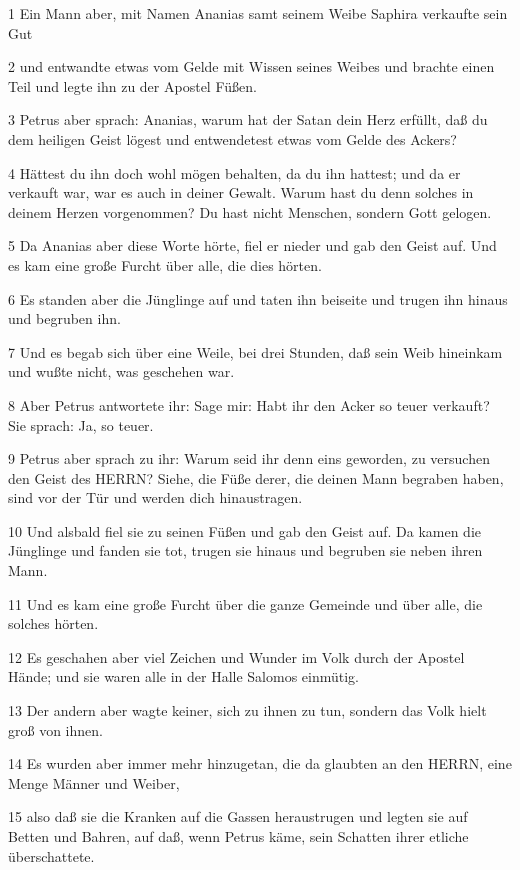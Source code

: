 \par 1 Ein Mann aber, mit Namen Ananias samt seinem Weibe Saphira verkaufte sein Gut
\par 2 und entwandte etwas vom Gelde mit Wissen seines Weibes und brachte einen Teil und legte ihn zu der Apostel Füßen.
\par 3 Petrus aber sprach: Ananias, warum hat der Satan dein Herz erfüllt, daß du dem heiligen Geist lögest und entwendetest etwas vom Gelde des Ackers?
\par 4 Hättest du ihn doch wohl mögen behalten, da du ihn hattest; und da er verkauft war, war es auch in deiner Gewalt. Warum hast du denn solches in deinem Herzen vorgenommen? Du hast nicht Menschen, sondern Gott gelogen.
\par 5 Da Ananias aber diese Worte hörte, fiel er nieder und gab den Geist auf. Und es kam eine große Furcht über alle, die dies hörten.
\par 6 Es standen aber die Jünglinge auf und taten ihn beiseite und trugen ihn hinaus und begruben ihn.
\par 7 Und es begab sich über eine Weile, bei drei Stunden, daß sein Weib hineinkam und wußte nicht, was geschehen war.
\par 8 Aber Petrus antwortete ihr: Sage mir: Habt ihr den Acker so teuer verkauft? Sie sprach: Ja, so teuer.
\par 9 Petrus aber sprach zu ihr: Warum seid ihr denn eins geworden, zu versuchen den Geist des HERRN? Siehe, die Füße derer, die deinen Mann begraben haben, sind vor der Tür und werden dich hinaustragen.
\par 10 Und alsbald fiel sie zu seinen Füßen und gab den Geist auf. Da kamen die Jünglinge und fanden sie tot, trugen sie hinaus und begruben sie neben ihren Mann.
\par 11 Und es kam eine große Furcht über die ganze Gemeinde und über alle, die solches hörten.
\par 12 Es geschahen aber viel Zeichen und Wunder im Volk durch der Apostel Hände; und sie waren alle in der Halle Salomos einmütig.
\par 13 Der andern aber wagte keiner, sich zu ihnen zu tun, sondern das Volk hielt groß von ihnen.
\par 14 Es wurden aber immer mehr hinzugetan, die da glaubten an den HERRN, eine Menge Männer und Weiber,
\par 15 also daß sie die Kranken auf die Gassen heraustrugen und legten sie auf Betten und Bahren, auf daß, wenn Petrus käme, sein Schatten ihrer etliche überschattete.

